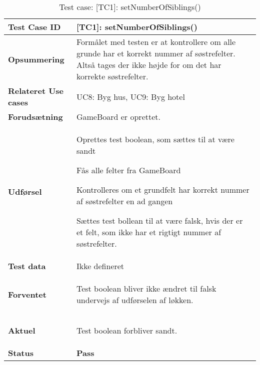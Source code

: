 \documentclass[class=article, crop=false]{standalone}
\makeatletter
\let\savespace\@minipagetrue
\makeatother
\begin{document}
    \begin{table}[H]
        \caption{Test case: [TC1]: setNumberOfSiblings()}
        \begin{tabularx}{\textwidth}{|l|X|}
            \hline
            \textbf{Test Case ID }       & \textbf{[TC1]: setNumberOfSiblings()}   \\ \hline
            \textbf{Opsummering}         & Formålet med testen er at kontrollere om alle grunde har et korrekt nummer af søstrefelter.
                                            Altså tages der ikke højde for om det har korrekte søstrefelter. \\ \hline
            \textbf{Relateret Use cases}     & UC8: Byg hus, UC9: Byg hotel      \\ \hline
            \textbf{Forudsætning}& GameBoard er oprettet.\\ \hline
            \textbf{Udførsel}            & \begin{tabenum}
                                               \item Oprettes test boolean, som sættes til at være sandt
                                               \item Fås alle felter fra GameBoard
                                               \item Kontrolleres om et grundfelt har korrekt nummer af søstrefelter en ad gangen
                                               \item Sættes test bollean til at være falsk, hvis der er et felt, som ikke har et rigtigt nummer af søstrefelter.
            \end{tabenum} \\ \hline
            \textbf{Test data}           &  Ikke defineret  \\ \hline
            \textbf{Forventet} & \savespace \begin{compactitem}
                                     \item Test boolean bliver ikke ændret til falsk undervejs af udførselen af løkken.
                                     \end{compactitem} \savespace \\    \hline
            \textbf{Aktuel} & \begin{tabenum}
                                  \item Test boolean forbliver sandt.
            \end{tabenum}   \\ \hline
            \textbf{Status} & \textbf{Pass} \\ \hline

\end{tabularx}
\end{table}
\end{document}
